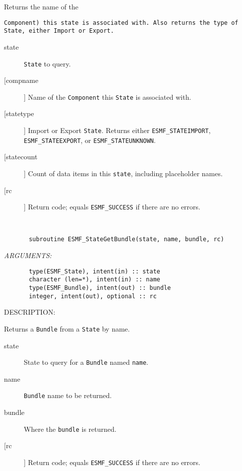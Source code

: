         Returns the name of the {\tt Component) this state is associated with.
        Also returns the type of {\tt State}, either {\tt Import} or 
        {\tt Export}.
  
    \begin{description}     
    \item[state]
      {\tt State} to query.
     \item[[compname]]
      Name of the {\tt Component} this {\tt State} is associated with.
     \item[[statetype]]
      Import or Export {\tt State}.  Returns either {\tt ESMF\_STATEIMPORT},
      {\tt ESMF\_STATEEXPORT}, or {\tt ESMF\_STATEUNKNOWN}.
     \item[[statecount]]
      Count of data items in this {\tt state}, including placeholder names.
     \item[[rc]]
      Return code; equals {\tt ESMF\_SUCCESS} if there are no errors.
    \end{description}
  
   
 
\mbox{}\hrulefill\ 
 

\begin{verbatim}       subroutine ESMF_StateGetBundle(state, name, bundle, rc)\end{verbatim}{\em ARGUMENTS:}
\begin{verbatim}       type(ESMF_State), intent(in) :: state
       character (len=*), intent(in) :: name
       type(ESMF_Bundle), intent(out) :: bundle
       integer, intent(out), optional :: rc             
 \end{verbatim}
{\sf DESCRIPTION:\\ }


        Returns a {\tt Bundle} from a {\tt State} by name.
  
    \begin{description}     
    \item[state]
      State to query for a {\tt Bundle} named {\tt name}.
    \item[name]
      {\tt Bundle} name to be returned.
    \item[bundle]
      Where the {\tt bundle} is returned.
    \item[[rc]]
      Return code; equals {\tt ESMF\_SUCCESS} if there are no errors.
    \end{description}
  
   
 
}
